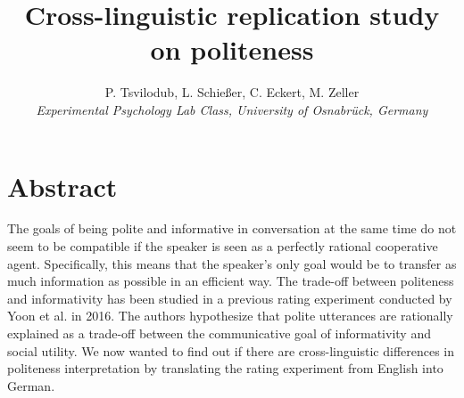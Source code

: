 \documentclass[a4paper,11pt]{article}
\title{Cross-linguistic replication study on politeness}
\author{P. Tsvilodub, L. Schießer, C. Eckert, M. Zeller 
\\ \textit{Experimental Psychology Lab Class, University of Osnabrück, Germany}}
\begin{document}
\maketitle

\section{Abstract}
The goals of being polite and informative in conversation at the same time do not seem to be compatible if the speaker is seen as a perfectly  rational cooperative agent. Specifically, this means that the speaker's only goal would be to transfer as much information as possible in an efficient way. The trade-off between politeness and informativity has been studied in a previous rating experiment conducted by Yoon et al. \cite{yoon2016talking} in 2016. The authors hypothesize that polite utterances are rationally explained as a trade-off between the communicative goal of informativity and social utility. We now wanted to find out if there are cross-linguistic differences in politeness interpretation by translating the rating experiment from English into German. 
\end{document}

